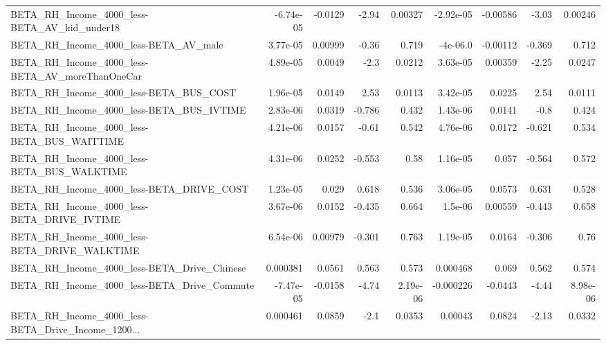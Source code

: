 \begin{tabular}{lrrrrrrrr}
BETA\_RH\_Income\_4000\_less-BETA\_AV\_kid\_under18       &   -6.74e-05 &      -0.0129 &     -2.94 &  0.00327 &  -2.92e-05 &    -0.00586 &        -3.03 &       0.00246 \\
BETA\_RH\_Income\_4000\_less-BETA\_AV\_male              &    3.77e-05 &      0.00999 &     -0.36 &    0.719 &   -4e-06.0 &    -0.00112 &       -0.369 &         0.712 \\
BETA\_RH\_Income\_4000\_less-BETA\_AV\_moreThanOneCar    &    4.89e-05 &       0.0049 &      -2.3 &   0.0212 &   3.63e-05 &     0.00359 &        -2.25 &        0.0247 \\
BETA\_RH\_Income\_4000\_less-BETA\_BUS\_COST             &    1.96e-05 &       0.0149 &      2.53 &   0.0113 &   3.42e-05 &      0.0225 &         2.54 &        0.0111 \\
BETA\_RH\_Income\_4000\_less-BETA\_BUS\_IVTIME           &    2.83e-06 &       0.0319 &    -0.786 &    0.432 &   1.43e-06 &      0.0141 &         -0.8 &         0.424 \\
BETA\_RH\_Income\_4000\_less-BETA\_BUS\_WAITTIME         &    4.21e-06 &       0.0157 &     -0.61 &    0.542 &   4.76e-06 &      0.0172 &       -0.621 &         0.534 \\
BETA\_RH\_Income\_4000\_less-BETA\_BUS\_WALKTIME         &    4.31e-06 &       0.0252 &    -0.553 &     0.58 &   1.16e-05 &       0.057 &       -0.564 &         0.572 \\
BETA\_RH\_Income\_4000\_less-BETA\_DRIVE\_COST           &    1.23e-05 &        0.029 &     0.618 &    0.536 &   3.06e-05 &      0.0573 &        0.631 &         0.528 \\
BETA\_RH\_Income\_4000\_less-BETA\_DRIVE\_IVTIME         &    3.67e-06 &       0.0152 &    -0.435 &    0.664 &    1.5e-06 &     0.00559 &       -0.443 &         0.658 \\
BETA\_RH\_Income\_4000\_less-BETA\_DRIVE\_WALKTIME       &    6.54e-06 &      0.00979 &    -0.301 &    0.763 &   1.19e-05 &      0.0164 &       -0.306 &          0.76 \\
BETA\_RH\_Income\_4000\_less-BETA\_Drive\_Chinese        &    0.000381 &       0.0561 &     0.563 &    0.573 &   0.000468 &       0.069 &        0.562 &         0.574 \\
BETA\_RH\_Income\_4000\_less-BETA\_Drive\_Commute        &   -7.47e-05 &      -0.0158 &     -4.74 & 2.19e-06 &  -0.000226 &     -0.0443 &        -4.44 &      8.98e-06 \\
BETA\_RH\_Income\_4000\_less-BETA\_Drive\_Income\_1200... &    0.000461 &       0.0859 &      -2.1 &   0.0353 &    0.00043 &      0.0824 &        -2.13 &        0.0332 \\

\end{tabular}
